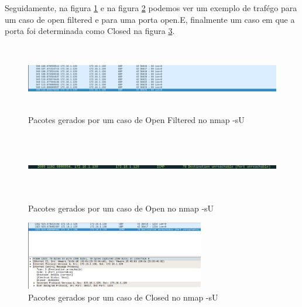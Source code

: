 Seguidamente, na figura \ref{fig:nmapsUOF} e na figura \ref{fig:nmapsuOpen} podemos ver um exemplo de trafégo para um caso de open filtered e para uma porta open.E, finalmente um caso em que a porta foi determinada como Closed na figura \ref{fig:nmapsUClosed}.

\begin{figure}[h!]
	\centering
		
	\includegraphics[width=\textwidth,height=3cm,keepaspectratio]{images/nmapSUoF.png}
		
	\caption{Pacotes gerados por um caso de Open Filtered no nmap -sU}
		
	\label{fig:nmapsUOF}
\end{figure}

\begin{figure}[h!]
	\centering
		
	\includegraphics[width=\textwidth,height=3cm,keepaspectratio]{images/nmapLast.png}
		
	\caption{Pacotes gerados por um caso de Open no nmap -sU}
		
	\label{fig:nmapsuOpen}
\end{figure}

\begin{figure}[h!]
	\centering
		
	\includegraphics[width=\textwidth,height=3cm,keepaspectratio]{images/nmapsUClosed.png}
		
	\caption{Pacotes gerados por um caso de Closed no nmap -sU}
		
	\label{fig:nmapsUClosed}
\end{figure}

